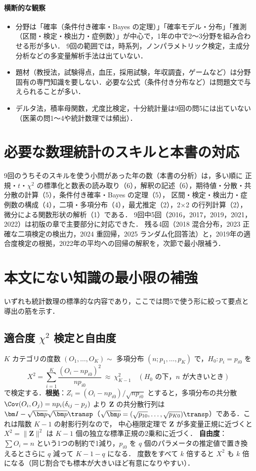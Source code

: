 \paragraph{横断的な観察}
\begin{itemize}
\item 分野は「確率（条件付き確率・Bayes の定理）」「確率モデル・分布」「推測（区間・検定・検出力・症例数）」が中心で，1年の中で2〜3分野を組み合わせる形が多い．
      9回の範囲では，時系列，ノンパラメトリック検定，主成分分析などの多変量解析手法は出ていない．
\item 題材（教授法，試験得点，血圧，採用試験，年収調査，ゲームなど）は分野固有の専門知識を要しない．必要な公式（条件付き分布など）は問題文で与えられることが多い．
\item デルタ法，積率母関数，尤度比検定，十分統計量は9回の問5には出ていない（医薬の問1〜4や統計数理では頻出）．
\end{itemize}

\section{必要な数理統計のスキルと本書の対応}\label{sec:G-skills}
9回のうちそのスキルを使う小問があった年の数（本書の分析）は，多い順に
正規・$t$・$\chi^2$ の標準化と数表の読み取り（6），解釈の記述（6），期待値・分散・共分散の計算（5），条件付き確率・Bayes の定理（5），
区間・検定・検出力・症例数の構成（4），二項・多項分布（4），最尤推定（2），2×2 の行列計算（2），微分による関数形状の解析（1）である．
9回中5回（2016，2017，2019，2021，2022）は初版の章で主要部分に対応できた．
残る4回（2018 混合分布，2023 正確な二項検定の検出力，2024 重回帰，2025 ランダム化回答法）と，2019年の適合度検定の根拠，2022年の平均への回帰の解釈を，次節で最小限補う．

\section{本文にない知識の最小限の補強}\label{sec:G-gaps}
いずれも統計数理の標準的な内容であり，ここでは問5で使う形に絞って要点と導出の筋を示す．

\subsection{適合度 \texorpdfstring{$\chi^2$}{χ²} 検定と自由度}\label{subsec:G-gof}
$K$ カテゴリの度数 $(O_1,\dots,O_K)\sim$ 多項分布 $(n;p_1,\dots,p_K)$ で，$H_0:p_i=p_{i0}$ を
\[
X^2=\sum_{i=1}^K\frac{(O_i-np_{i0})^2}{np_{i0}}\ \approx\ \chi^2_{K-1}\quad(H_0\text{ の下，}n\text{ が大きいとき})
\]
で検定する．\textbf{根拠}：$Z_i=(O_i-np_{i0})/\sqrt{np_{i0}}$ とすると，多項分布の共分散 $\Cov(O_i,O_j)=n p_i(\delta_{ij}-p_j)$ より
$\bm Z$ の共分散行列は $\bm I-\sqrt{\bm p}\sqrt{\bm p}\transp$（$\sqrt{\bm p}=(\sqrt{p_{10}},\dots,\sqrt{p_{K0}})\transp$）である．これは階数 $K-1$ の射影行列なので，
中心極限定理で $\bm Z$ が多変量正規に近づくと $X^2=\|\bm Z\|^2$ は $K-1$ 個の独立な標準正規の2乗和に近づく．
\textbf{自由度}：$\sum O_i=n$ という1つの制約で1減り，$p_{i0}$ を $q$ 個のパラメータの推定値で置き換えるとさらに $q$ 減って $K-1-q$ になる．
度数をすべて $k$ 倍すると $X^2$ も $k$ 倍になる（同じ割合でも標本が大きいほど有意になりやすい）．

